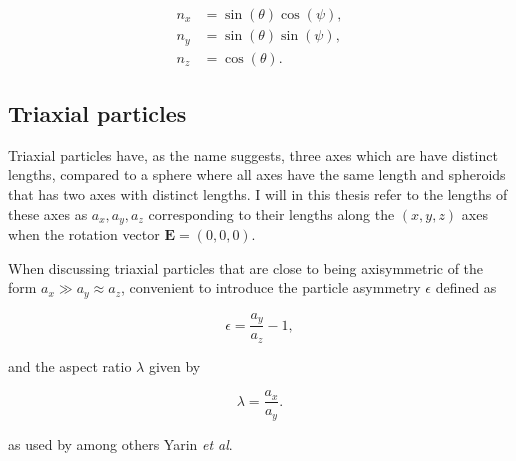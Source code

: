 \begin{subequations}\label{eq:nzEq}
\begin{align}
n_x 	&= \sin(\theta)\cos(\psi), \\
n_y 	&= \sin(\theta)\sin(\psi),\\
n_z		&= \cos(\theta).
\end{align}
\end{subequations}

\subsection{Triaxial particles}
Triaxial particles have, as the name suggests, three axes which are have distinct lengths, compared to a sphere where all axes have the same length and spheroids that has two axes with distinct lengths. I will in this thesis refer to the lengths of these axes as $a_x, a_y, a_z$ corresponding to their lengths along the $(x,y,z)$ axes when the rotation vector $\mathbf{E} = (0,0,0)$. 

When discussing triaxial particles that are close to being axisymmetric of the form $a_x \gg a_y \approx a_z$, convenient to introduce the particle asymmetry $\epsilon$ defined as

\begin{equation}\label{eq:epsilon}
\epsilon = \frac{a_y}{a_z} - 1,
\end{equation}

and the aspect ratio $\lambda$ given by

\begin{equation}\label{eq:lambda}
\lambda = \frac{a_x}{a_y}.
\end{equation}

as used by among others Yarin \emph{et al}\cite{Yarin}.



